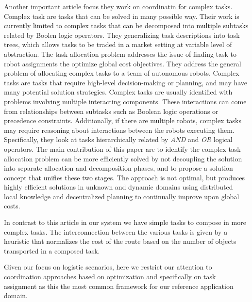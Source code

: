 Another important article \cite{market-based} focus they work on coordinatin for complex tasks.
Complex task are tasks that can be solved in many possible way. Their work is currently 
limited to complex tasks that can be decomposed into multiple subtasks related by Boolen logic operators.
They generalizing task descriptions into task trees, which allows tasks to be traded
in a market setting at variable level of abstraction. 
The task allocation problem addresses the issue of finding task-to-robot assignments the optimize
global cost objectives. 
They address the general problem of allocating complex tasks to a team of autonomous robots.
Complex tasks are tasks that require high-level decision-making or planning,
and may have many potential solution strategies.
Complex tasks are usually identified with problems involving multiple interacting components.
These interactions can come from relationships between subtasks such
as Boolean logic operations or precedence constraints. 
Additionally, if there are multiple robots, complex tasks may
require reasoning about interactions between the robots executing them.
Specifically, they look at tasks hierarchically
related by \textit{AND} and \textit{OR} logical operators.
The main contribution of this paper are to identify the complex task allocation problem
can be more efficiently solved by not decoupling the solution into separate allocation
and decomposition phases, and to propose a solution concept that unifies these two stages.
The approach is not optimal, but produces highly efficient solutions in unknown
and dynamic domains using distributed local knowledge and decentralized planning 
to continually improve upon global costs.

In contrast to this article in our system we have simple tasks to compose in more complex tasks.
The interconnection between the various tasks is given by a heuristic that normalizes the cost of the route 
based on the number of objects transported in a composed task.

Given our focus on logistic scenarios, here we restrict our attention to coordination
approaches based on optimization and specifically on task assignment as this the most 
common framework for our reference application domain.
